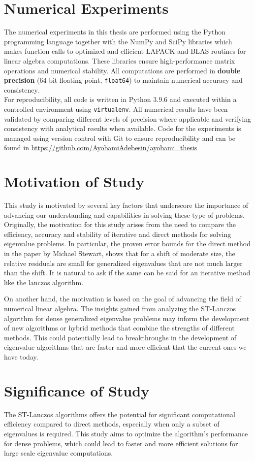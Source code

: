 \section{Numerical Experiments}
The numerical experiments in this thesis are performed using the Python programming language together with the NumPy and SciPy libraries which makes function calls to optimized and efficient LAPACK and BLAS routines for linear algebra computations. These libraries ensure high-performance matrix operations and numerical stability. All computations are performed in \textbf{double precision} (64 bit floating point, \texttt{float64}) to maintain numerical accuracy and consistency.\\
For reproducibility, all code is written in Python $3.9.6$ and executed within a controlled environment using \texttt{virtualenv}. All numerical results have been validated by comparing different levels of precision where applicable and verifying consistency with analytical results when available. Code for the experiments is managed using version control with Git to ensure reproducibility and can be found in \href{https://github.com/AyobamiAdebesin/ayobami_thesis}{https://github.com/AyobamiAdebesin/ayobami\_thesis}
\section{Motivation of Study}
This study is motivated by several key factors that underscore the importance of advancing our understanding and capabilities in solving these type of problems. Originally, the motivation for this study arises from the need to compare the efficiency, accuracy and stability of iterative and direct methods for solving eigenvalue problems. In particular, the proven error bounds for the direct method in the paper by Michael Stewart, shows that for a shift of moderate size, the relative residuals are small for generalized eigenvalues that are not much larger than the shift. It is natural to ask if the same can be said for an iterative method like the lanczos algorithm.\par
On another hand, the motivation is based on the goal of advancing the field of numerical linear algebra. The insights gained from analyzing the ST-Lanczos algorithm for dense generalized eigenvalue problems may inform the development of new algorithms or hybrid methods that combine the strengths of different methods. This could potentially lead to breakthroughs in the development of eigenvalue algorithms that are faster and more efficient that the current ones we have today.\\
\section{Significance of Study}
The ST-Lanczos algorithms offers the potential for significant computational efficiency compared to direct methods, especially when only a subset of eigenvalues is required. This study aims to optimize the algorithm's performance for dense problems, which could lead to faster and more efficient solutions for large scale eigenvalue computations.